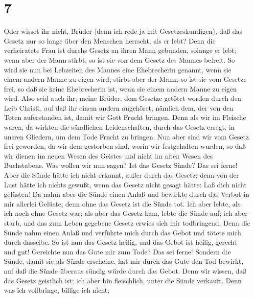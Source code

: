 \hypertarget{section-6}{%
\section{7}\label{section-6}}

 Oder wisset ihr nicht, Brüder (denn ich rede ja mit
Gesetzeskundigen), daß das Gesetz nur so lange über den Menschen
herrscht, als er lebt?  Denn die verheiratete Frau ist
durchs Gesetz an ihren Mann gebunden, solange er lebt; wenn aber der
Mann stirbt, so ist sie von dem Gesetz des Mannes befreit.
 So wird sie nun bei Lebzeiten des Mannes eine
Ehebrecherin genannt, wenn sie einem andern Manne zu eigen wird; stirbt
aber der Mann, so ist sie vom Gesetze frei, so daß sie keine
Ehebrecherin ist, wenn sie einem andern Manne zu eigen wird.
 Also seid auch ihr, meine Brüder, dem Gesetze getötet
worden durch den Leib Christi, auf daß ihr einem andern angehöret,
nämlich dem, der von den Toten auferstanden ist, damit wir Gott Frucht
bringen.  Denn als wir im Fleische waren, da wirkten die
sündlichen Leidenschaften, durch das Gesetz erregt, in unsren Gliedern,
um dem Tode Frucht zu bringen.  Nun aber sind wir vom
Gesetz frei geworden, da wir dem gestorben sind, worin wir festgehalten
wurden, so daß wir dienen im neuen Wesen des Geistes und nicht im alten
Wesen des Buchstabens.  Was wollen wir nun sagen? Ist das
Gesetz Sünde? Das sei ferne! Aber die Sünde hätte ich nicht erkannt,
außer durch das Gesetz; denn von der Lust hätte ich nichts gewußt, wenn
das Gesetz nicht gesagt hätte: Laß dich nicht gelüsten! 
Da nahm aber die Sünde einen Anlaß und bewirkte durch das Verbot in mir
allerlei Gelüste; denn ohne das Gesetz ist die Sünde tot. 
Ich aber lebte, als ich noch ohne Gesetz war; als aber das Gesetz kam,
lebte die Sünde auf;  ich aber starb, und das zum Leben
gegebene Gesetz erwies sich mir todbringend.  Denn die
Sünde nahm einen Anlaß und verführte mich durch das Gebot und tötete
mich durch dasselbe.  So ist nun das Gesetz heilig, und
das Gebot ist heilig, gerecht und gut!  Gereichte nun das
Gute mir zum Tode? Das sei ferne! Sondern die Sünde, damit sie als Sünde
erscheine, hat mir durch das Gute den Tod bewirkt, auf daß die Sünde
überaus sündig würde durch das Gebot.  Denn wir wissen,
daß das Gesetz geistlich ist; ich aber bin fleischlich, unter die Sünde
verkauft.  Denn was ich vollbringe, billige ich nicht;
